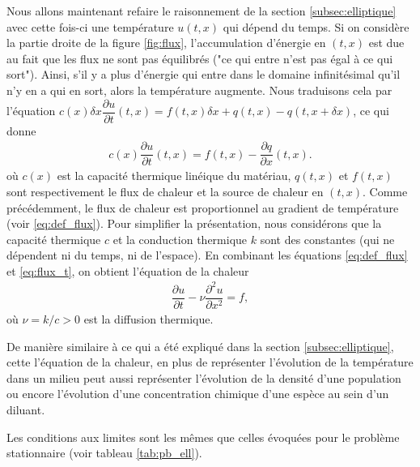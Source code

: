 \documentclass[12pt,a4paper,twoside]{article}
\begin{document}
Nous allons maintenant refaire le raisonnement de la section \ref{subsec:elliptique}
avec cette fois-ci une temp\'erature $u(t,x)$ qui d\'epend du temps.
Si on consid\`ere la partie droite de la figure \ref{fig:flux}, l'accumulation
d'\'energie en $(t,x)$ est due au fait que les flux ne sont pas \'equilibr\'es
("ce qui entre n'est pas \'egal \`a ce qui sort").
Ainsi, s'il y a plus d'\'energie qui entre dans le domaine infinit\'esimal
qu'il n'y en a qui en sort,
alors la temp\'erature augmente.
Nous traduisons cela par l'\'equation
$c (x) \delta x \dfrac{\partial u}{\partial t}(t,x) = f(t,x) \delta x 
  + q(t,x) - q(t,x + \delta x)$, ce qui donne
\begin{align}
  \label{eq:flux_t}
  c (x) \dfrac{\partial u}{\partial t}(t,x) = f(t,x) - \dfrac{\partial q}{\partial x} (t,x) .
\end{align}
o\`u $c(x)$ est la capacit\'e thermique lin\'eique du mat\'eriau,
$q(t,x)$ et $f(t,x)$ sont respectivement le flux de chaleur 
et la source de chaleur en $(t,x)$.
Comme pr\'ec\'edemment, le flux de chaleur est proportionnel au gradient 
de temp\'erature (voir \eqref{eq:def_flux}).
Pour simplifier la pr\'esentation, nous consid\'erons que la capacit\'e
thermique $c$ et la conduction thermique $k$ sont des constantes 
(qui ne d\'ependent ni du temps, ni de l'espace).
En combinant les \'equations \eqref{eq:def_flux} et \eqref{eq:flux_t},
on obtient l'\'equation de la chaleur
\begin{align}
  \label{eq:chaleur}
  \dfrac{\partial u}{\partial t} - \nu \dfrac{\partial^2 u}{\partial x^2} = f ,
\end{align}
o\`u $\nu = k/c > 0$ est la diffusion thermique.


De mani\`ere similaire \`a ce qui a \'et\'e expliqu\'e dans la section \ref{subsec:elliptique},
cette l'\'equation de la chaleur, en plus de repr\'esenter l'\'evolution de la temp\'erature
dans un milieu peut aussi repr\'esenter l'\'evolution de la densit\'e d'une population
ou encore l'\'evolution d'une concentration chimique d'une esp\`ece au sein d'un diluant.

Les conditions aux limites sont les m\^emes que celles \'evoqu\'ees pour le probl\`eme
stationnaire (voir tableau \ref{tab:pb_ell}).
\end{document}
